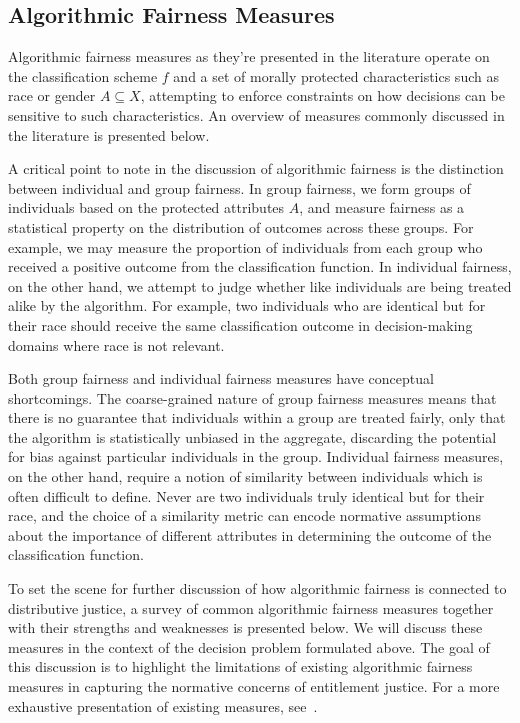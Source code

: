\subsection{Algorithmic Fairness Measures}\label{sec:fairness-measures}

Algorithmic fairness measures as they're presented in the literature operate on
the classification scheme $f$ and a set of morally protected characteristics
such as race or gender $A \subseteq X$, attempting to enforce constraints on how 
decisions can be sensitive to such characteristics. An overview of measures
commonly discussed in the literature is presented below.

A critical point to note in the discussion of algorithmic fairness is the 
distinction between individual and group fairness. In group fairness, we form
groups of individuals based on the protected attributes $A$, and measure
fairness as a statistical property on the distribution of outcomes across these
groups. For example, we may measure the proportion of individuals from each
group who received a positive outcome from the classification function. In
individual fairness, on the other hand, we attempt to judge whether like
individuals are being treated alike by the algorithm. For example, two
individuals who are identical but for their race should receive the same
classification outcome in decision-making domains where race is not relevant. 

Both group fairness and individual fairness measures have conceptual
shortcomings. The coarse-grained nature of group fairness measures means that
there is no guarantee that individuals within a group are treated fairly, only
that the algorithm is statistically unbiased in the aggregate, discarding
the potential for bias against particular individuals in the group. Individual
fairness measures, on the other hand, require a notion of similarity between
individuals which is often difficult to define. Never are two individuals
truly identical but for their race, and the choice of a similarity metric can
encode normative assumptions about the importance of different attributes in
determining the outcome of the classification function.

To set the scene for further discussion of how algorithmic fairness is 
connected to distributive justice, a survey of common algorithmic fairness 
measures together with their strengths and weaknesses is presented below.
We will discuss these measures in the context of the decision problem formulated
above. The goal of this discussion is to highlight the limitations of
existing algorithmic fairness measures in capturing the normative concerns of 
entitlement justice. For a more exhaustive presentation of existing measures,
see~\cite{CorbettDavies_2023}.

